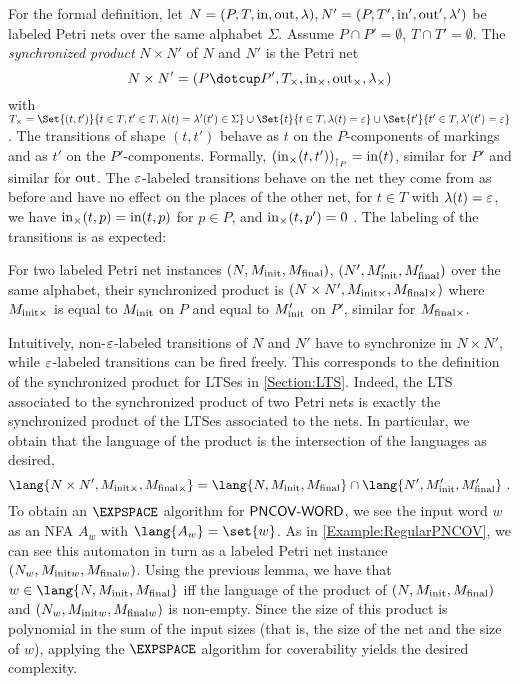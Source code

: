 \documentclass[../../diss.tex]{subfiles}
\begin{document}
For the formal definition, let $N = (P,T,\text{in},\text{out},\lambda), N' = (P,T',\text{in}',\text{out}',\lambda')$ be labeled Petri nets over the same alphabet $\Sigma$.
Assume $P \cap P' = \emptyset$, $T \cap T' = \emptyset$.
The \emph{synchronized product} $N \times N'$ of $N$ and $N'$ is the Petri net
\[
    N \times N' = (P \dotcup P', T_\times, \i_\times, \o_\times,\lambda_\times)
\]
with $T_\times = \Set{ (t,t') }{ t \in T, t' \in T, \lambda(t) = \lambda'(t') \in \Sigma} \cup \Set{ t }{ t \in T, \lambda(t) = \eps} \cup \Set{ t' }{ t' \in T, \lambda'(t') = \eps}$.
The transitions of shape $(t,t')$ behave as $t$ on the $P$-components of markings and as $t'$ on the $P'$-components.
Formally, ${(\text{in}_\times (t,t'))}_{\restriction_P} = \text{in}(t)$, similar for $P'$ and similar for $\text{out}$.
The $\varepsilon$-labeled transitions behave on the net they come from as before and have no effect on the places of the other net, \eg for $t \in T$ with $\lambda(t) = \varepsilon$, we have $\text{in}_\times(t,p) = \text{in}(t,p)$ for $p \in P$, and $\text{in}_\times(t,p') = 0$ .
The labeling of the transitions is as expected: 

For two labeled Petri net instances $(N,M_{\text{init}},M_{\text{final}})$,  $(N',M_{\text{init}}',M_{\text{final}}')$ over the same alphabet, their synchronized product is
\(
    (N \times N',M_{{\text{init}}\times},M_{{\text{final}}\times})
\)
where $M_{{\text{init}}\times}$ is equal to $M_{\text{init}}$ on $P$ and equal to $M_{\text{init}}'$ on $P'$, similar for $M_{{\text{final}}\times}$.

Intuitively, non-$\varepsilon$-labeled transitions of $N$ and $N'$ have to synchronize in $N \times N'$, while $\varepsilon$-labeled transitions can be fired freely.
This corresponds to the definition of the synchronized product for LTSes in \cref{Section:LTS}.
Indeed, the LTS associated to the synchronized product of two Petri nets is exactly the synchronized product of the LTSes associated to the nets.
In particular, we obtain that the language of the product is the intersection of the languages as desired,
\[
    \lang{N \times N',M_{\init\times},M_{\final\times}}
    = \lang{N,\Minit,\Mfinal} \cap \lang{N',\Minit',\Mfinal'}
    \ .
\]
To obtain an $\EXPSPACE$ algorithm for $\mathsf{PNCOV\text{-}WORD}$, we see the input word $w$ as an NFA $A_w$ with $\lang{A_w} = \set{w}$.
As in \cref{Example:RegularPNCOV}, we can see this automaton in turn as a labeled Petri net instance $(N_w,M_{{\text{init}} w},M_{{\text{final}} w})$.
Using the previous lemma, we have that $w \in \lang{N,\Minit,\Mfinal}$ iff the language of the product of $(N,M_{\text{init}},M_{\text{final}})$ and $(N_w,M_{{\text{init}} w},M_{{\text{final}} w})$ is non-empty.
Since the size of this product is polynomial in the sum of the input sizes (that is, the size of the net and the size of $w$), applying the $\EXPSPACE$ algorithm for coverability yields the desired complexity.
\end{document}
